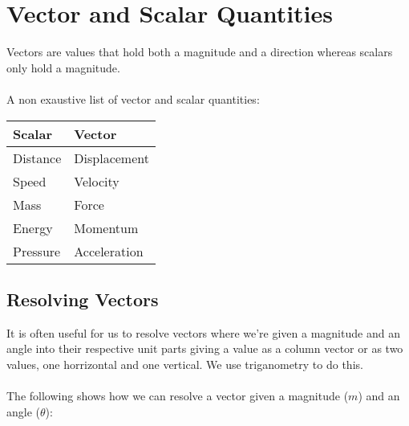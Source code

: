 \documentclass{article}
\begin{document}
\section{Vector and Scalar Quantities}
Vectors are values that hold both a magnitude and a direction whereas scalars only hold a magnitude.
\\\\
A non exaustive list of vector and scalar quantities:
\begin{center}
	\begin{tabular}{|l|l|}
		\hline
		\textbf{Scalar} & \textbf{Vector} \\ \hline
		Distance        & Displacement \\
		Speed           & Velocity \\
		Mass            & Force \\
		Energy          & Momentum \\
        Pressure        & Acceleration \\
		\hline
	\end{tabular}
\end{center}

\subsection{Resolving Vectors}
It is often useful for us to resolve vectors where we're given a magnitude and an angle into
their respective unit parts giving a value as a column vector or as two values, one horrizontal and
one vertical. We use triganometry to do this.
\\\\
The following shows how we can resolve a vector given a magnitude ($m$) and an angle ($\theta$):
\begin{center}
\end{center}
\end{document}

